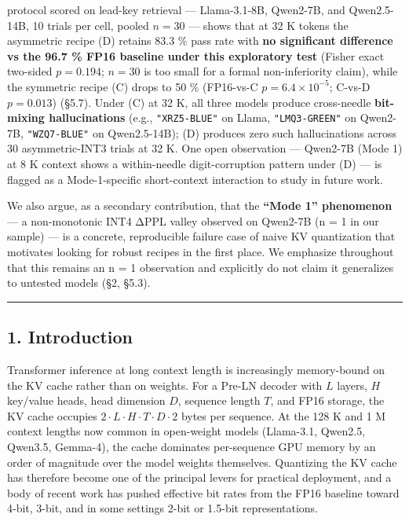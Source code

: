 \documentclass[
]{article}
\begin{document}
\begin{enumerate}
  protocol scored on lead-key retrieval --- Llama-3.1-8B, Qwen2-7B, and
  Qwen2.5-14B, 10 trials per cell, pooled \(n = 30\) --- shows that at
  32 K tokens the asymmetric recipe (D) retains 83.3 \% pass rate with
  \textbf{no significant difference vs the 96.7 \% FP16 baseline under
  this exploratory test} (Fisher exact two-sided \(p = 0.194\);
  \(n = 30\) is too small for a formal non-inferiority claim), while the
  symmetric recipe (C) drops to 50 \% (FP16-vs-C
  \(p = 6.4 \times 10^{-5}\); C-vs-D \(p = 0.013\)) (§5.7). Under (C) at
  32 K, all three models produce cross-needle \textbf{bit-mixing
  hallucinations} (e.g., \texttt{"XRZ5-BLUE"} on Llama,
  \texttt{"LMQ3-GREEN"} on Qwen2-7B, \texttt{"WZQ7-BLUE"} on
  Qwen2.5-14B); (D) produces zero such hallucinations across 30
  asymmetric-INT3 trials at 32 K. One open observation --- Qwen2-7B
  (Mode 1) at 8 K context shows a within-needle digit-corruption pattern
  under (D) --- is flagged as a Mode-1-specific short-context
  interaction to study in future work.
\end{enumerate}

We also argue, as a secondary contribution, that the \textbf{``Mode 1''
phenomenon} --- a non-monotonic INT4 ΔPPL valley observed on Qwen2-7B (n
= 1 in our sample) --- is a concrete, reproducible failure case of naive
KV quantization that motivates looking for robust recipes in the first
place. We emphasize throughout that this remains an n = 1 observation
and explicitly do not claim it generalizes to untested models (§2,
§5.3).

\begin{center}\rule{0.5\linewidth}{0.5pt}\end{center}

\subsection{1. Introduction}\label{introduction}

Transformer inference at long context length is increasingly
memory-bound on the KV cache rather than on weights. For a Pre-LN
decoder with \(L\) layers, \(H\) key/value heads, head dimension \(D\),
sequence length \(T\), and FP16 storage, the KV cache occupies
\(2 \cdot L \cdot H \cdot T \cdot D \cdot 2\) bytes per sequence. At the
128 K and 1 M context lengths now common in open-weight models
(Llama-3.1, Qwen2.5, Qwen3.5, Gemma-4), the cache dominates per-sequence
GPU memory by an order of magnitude over the model weights themselves.
Quantizing the KV cache has therefore become one of the principal levers
for practical deployment, and a body of recent work has pushed effective
bit rates from the FP16 baseline toward 4-bit, 3-bit, and in some
settings 2-bit or 1.5-bit representations.
\end{document}
